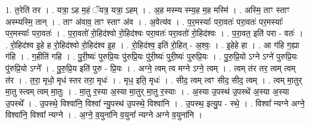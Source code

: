 \documentclass[17pt]{extarticle}
\begin{document}
1. त॒रेति॑ तर । . यत्रा॒ ऽह म॒हं ॅयत्र॒ यत्रा॒ ऽहम् । . अ॒ह मस्म्य स्म्य॒ह म॒ह मस्मि॑ । . अस्मि॒ ताꣳ स्ताꣳ अस्म्यस्मि॒ तान् । . ताꣳ अ॑वाव॒ ताꣳ स्ताꣳ अ॑व । . अ॒वेत्य॑व । . प॒र॒मस्याः᳚ परा॒वतः॑ परा॒वतः॑ पर॒मस्याः᳚ पर॒मस्याः᳚ परा॒वतः॑ । . प॒रा॒वतो॑ रो॒हिद॑श्वो रो॒हिद॑श्वः परा॒वतः॑ परा॒वतो॑ रो॒हिद॑श्वः । . प॒रा॒वत॒ इति॑ परा - वतः॑ । . रो॒हिद॑श्व इ॒हे ह रो॒हिद॑श्वो रो॒हिद॑श्व इ॒ह । . रो॒हिद॑श्व॒ इति॑ रो॒हित् - अ॒श्वः॒ । . इ॒हेहे हा । . आ ग॑हि ग॒ह्या ग॑हि । . ग॒हीति॑ गहि । . पु॒री॒ष्यः॑ पुरुप्रि॒यः पु॑रुप्रि॒यः पु॑री॒ष्यः॑ पुरी॒ष्यः॑ पुरुप्रि॒यः । . पु॒रु॒प्रि॒यो ऽग्ने ऽग्ने॑ पुरुप्रि॒यः पु॑रुप्रि॒यो ऽग्ने᳚ । . पु॒रु॒प्रि॒य इति॑ पुरु - प्रि॒यः । . अग्ने॒ त्वम् त्व मग्ने ऽग्ने॒ त्वम् । . त्वम् त॑र तर॒ त्वम् त्वम् त॑र । . त॒रा॒ मृधो॒ मृध॑ स्तर तरा॒ मृधः॑ । . मृध॒ इति॒ मृधः॑ । . सीद॒ त्वम् त्वꣳ सीद॒ सीद॒ त्वम् । . त्वम् मा॒तुर् मा॒तु स्त्वम् त्वम् मा॒तुः । . मा॒तु र॒स्या अ॒स्या मा॒तुर् मा॒तु र॒स्याः । . अ॒स्या उ॒पस्थ॑ उ॒पस्थे॑ अ॒स्या अ॒स्या उ॒पस्थे᳚ । . उ॒पस्थे॒ विश्वा॑नि॒ विश्वा᳚ न्यु॒पस्थ॑ उ॒पस्थे॒ विश्वा॑नि । . उ॒पस्थ॒ इत्यु॒प - स्थे॒ । . विश्वा᳚ न्यग्ने अग्ने॒ विश्वा॑नि॒ विश्वा᳚ न्यग्ने । . अ॒ग्ने॒ व॒युना॑नि व॒युना᳚ न्यग्ने अग्ने व॒युना॑नि । \newline
\end{document}
